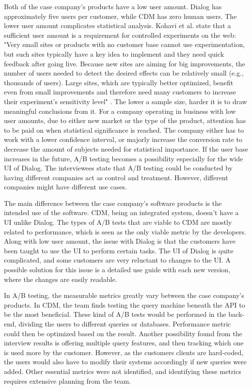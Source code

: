 \documentclass[english, grading]{tktltiki2}
\theoremstyle{definition}
\theoremstyle{remark}
\begin{document}
Both of the case company's products have a low user amount. Dialog has approximately five users per customer, while CDM has zero human users. The lower user amount complicates statistical analysis. Kohavi et al. state that a sufficient user amount is a requirement for controlled experiments on the web: "Very small sites or products with no customer base cannot use experimentation, but such sites typically have a key idea to implement and they need quick feedback after going live. Because new sites are aiming for big improvements, the number of users needed to detect the desired effects can be relatively small (e.g., thousands of users). Large sites, which are typically better optimized, benefit even from small improvements and therefore need many customers to increase their experiment’s sensitivity level" \cite{kohavi2009online}. The lower a sample size, harder it is to draw meaningful conclusions from it. For a company operating in business with low user amounts, due to either new market or the type of the product, attention has to be paid on when statistical significance is reached. The company either has to work with a lower confidence interval, or majorly increase the conversion rate to decrease the amount of subjects needed for statistical importance. If the user base increases in the future, A/B testing becomes a possibility especially for the wide UI of Dialog. The interviewees state that A/B testing could be conducted by having different companies act as control and treatment. However, different companies might have different use cases.

The main difference between the case company's software products is the intended use of the software. CDM, being an integrated system, doesn't have a UI unlike Dialog. The types of A/B tests that are viable to CDM are mostly related to performance, which is seen as the only viable metric by the developers. Along with low user amount, the issue with Dialog is that the customers have been taught to use the UI to perform certain tasks. The UI of Dialog is quite complicated, and some customers are very reluctant to changes to the UI. A possible solution for this issue is a detailed use guide with each new version, where the changes are easily readable. 

In A/B testing, the measurable metrics greatly vary between the case company's products. In CDM, the team finds testing the query machine beneath the API to be the most beneficial. These kind of A/B tests would be performed in the back-end, dividing the users to different queries or databases. Performance metric could then be optimized based on the result. Another possibility found from the interview results is offering multiple query features, and then tracking which one is used more by the customer. However, as the customers clients are hard-coded, the users would also have to modify their systems accordingly if new queries were added. Other essential metrics were not identified, and identifying these metrics requires extensive planning from the team.
\end{document}
